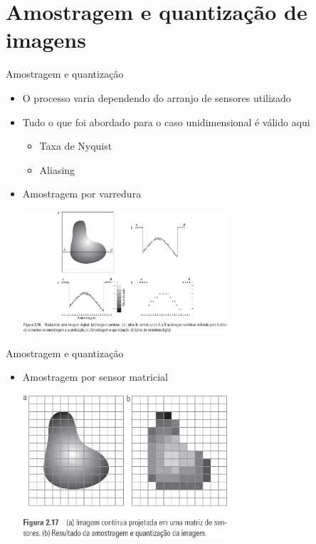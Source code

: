    \section[ slide = true ]{Amostragem e quantização de imagens}
   \begin{slide}[toc=]{Amostragem e quantização}
     \begin{itemize}
       \item O processo varia dependendo do arranjo de sensores utilizado
       \item Tudo o que foi abordado para o caso unidimensional é válido aqui
       \begin{itemize}
         \item Taxa de Nyquist
         \item Aliasing
       \end{itemize}
       \item Amostragem por varredura
        \begin{center}
          \includegraphics[width=0.6\textwidth]{figs/fig0216}
        \end{center}
     \end{itemize}
   \end{slide}
   
   \begin{slide}[toc=]{Amostragem e quantização}
     \begin{itemize}
        \item Amostragem por sensor matricial
        \begin{center}
          \includegraphics[width=0.6\textwidth]{figs/fig0217}
        \end{center}
     \end{itemize}
   \end{slide}
        
